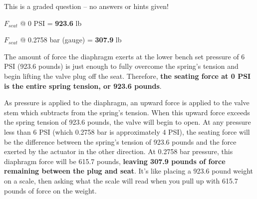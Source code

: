 
This is a graded question -- no answers or hints given!







$F_{seat}$ @ 0 PSI = {\bf 923.6} lb

\vskip 10pt

$F_{seat}$ @ 0.2758 bar (gauge) = {\bf 307.9} lb

\vskip 10pt

The amount of force the diaphragm exerts at the lower bench set pressure of 6 PSI (923.6 pounds) is just enough to fully overcome the spring's tension and begin lifting the valve plug off the seat.  Therefore, {\bf the seating force at 0 PSI is the entire spring tension, or 923.6 pounds}.

\vskip 10pt

As pressure is applied to the diaphragm, an upward force is applied to the valve stem which subtracts from the spring's tension.  When this upward force exceeds the spring tension of 923.6 pounds, the valve will begin to open.  At any pressure less than 6 PSI (which 0.2758 bar is approximately 4 PSI), the seating force will be the difference between the spring's tension of 923.6 pounds and the force exerted by the actuator in the other direction.  At 0.2758 bar pressure, this diaphragm force will be 615.7 pounds, {\bf leaving 307.9 pounds of force remaining between the plug and seat}.  It's like placing a 923.6 pound weight on a scale, then asking what the scale will read when you pull up with 615.7 pounds of force on the weight.





